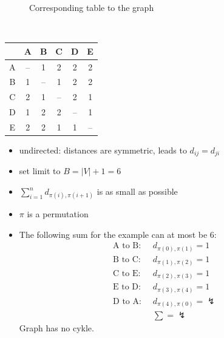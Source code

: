 \documentclass[a4]{scrartcl}
\let\stmaryrdLightning\lightning
\begin{document}

\begin{minipage}{0.7\textwidth}
\begin{figure}[H]
\begin{center}
\end{center}
\caption{Corresponding table to the graph}
\end{figure}

\end{minipage}\begin{minipage}{0.05\textwidth}
\ \\
\end{minipage}\begin{minipage}{0.25\textwidth}
\begin{tabular}{c|c|c|c|c|c|}
 & A & B & C & D & E \\
\hline
A & -- & 1 & 2 & 2 & 2 \\
\hline
B & 1 & -- & 1 & 2 & 2 \\
\hline
C & 2 & 1 & -- & 2 & 1 \\
\hline
D & 1 & 2 & 2 & -- & 1 \\
\hline
E & 2 & 2 & 1 & 1 & -- \\
\hline
\end{tabular}


\end{minipage}

\begin{itemize}
\item undirected: distances are symmetric, leads to $d_{ij} = d_{ji}$
\item set limit to $B = |V|+1 = 6$
\item $\sum^{n}_{i=1} d_{\pi(i), \pi(i+1)}$ is as small as possible
\item $\pi$ is a permutation
\item[] The following sum for the example can at most be 6:
\begin{align*}
 \text{A to B: } & \  d_{\pi(0), \pi(1)} =  1 \\
  \text{B to C: } & \  d_{\pi(1), \pi(2)} = 1\\
   \text{C to E: } & \  d_{\pi(2), \pi(3)} = 1 \\
 \text{E to D: } & \  d_{\pi(3), \pi(4)} =  1\\
 \text{D to A: } & \  d_{\pi(4), \pi(0)} = \stmaryrdLightning
 \\
 & \ \sum = \stmaryrdLightning
\end{align*}
Graph has no cykle.
\end{itemize}
\end{document}
